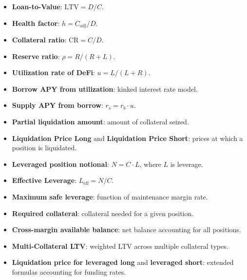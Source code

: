 \begin{itemize}
  \item \textbf{Loan-to-Value}: $\mathrm{LTV} = D/C$.
  \item \textbf{Health factor}: $h = C_{\mathrm{adj}} / D$.
  \item \textbf{Collateral ratio}: $\mathrm{CR} = C/D$.
  \item \textbf{Reserve ratio}: $\rho = R / (R + L)$.
  \item \textbf{Utilization rate of DeFi}: $u = L / (L + R)$.
  \item \textbf{Borrow APY from utilization}: kinked interest rate model.
  \item \textbf{Supply APY from borrow}: $r_s = r_b \cdot u$.
  \item \textbf{Partial liquidation amount}: amount of collateral seized.
  \item \textbf{Liquidation Price Long} and \textbf{Liquidation Price Short}:
    prices at which a position is liquidated.
  \item \textbf{Leveraged position notional}: $N = C \cdot L$, where $L$ is leverage.
  \item \textbf{Effective Leverage}: $L_{\mathrm{eff}} = N/C$.
  \item \textbf{Maximum safe leverage}: function of maintenance margin rate.
  \item \textbf{Required collateral}: collateral needed for a given position.
  \item \textbf{Cross-margin available balance}: net balance accounting for all positions.
  \item \textbf{Multi-Collateral LTV}: weighted LTV across multiple collateral types.
  \item \textbf{Liquidation price for leveraged long} and \textbf{leveraged short}:
    extended formulas accounting for funding rates.
\end{itemize}
